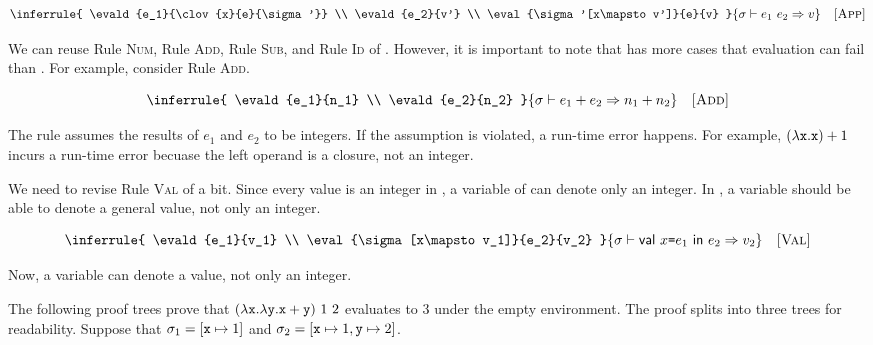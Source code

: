 \[
  \inferrule
  {
    \evald{e_1}{\clov{x}{e}{\sigma'}} \\
    \evald{e_2}{v'} \\
    \eval{\sigma'[x\mapsto v']}{e}{v}
  }
  { \evald{\eapp{e_1}{e_2}}{v} }
  \quad\textsc{[App]}
\]

We can reuse Rule \textsc{Num}, Rule \textsc{Add}, Rule \textsc{Sub}, and Rule \textsc{Id} of
\plang. However, it is important to note that \lang has more
cases that evaluation can fail than \plang. For example, consider Rule \textsc{Add}.


\vspace{-1em}

\[
  \inferrule
  {
    \evald{e_1}{n_1} \\
    \evald{e_2}{n_2}
  }
  { \evald{\eadd{e_1}{e_2}}{n_1+n_2} }
  \quad\textsc{[Add]}
\]

The rule assumes the results of $e_1$ and $e_2$ to be integers. If the
assumption is violated, a run-time error happens. For example,
$(\lambda\texttt{x}.\texttt{x})+1$ incurs a run-time error becuase the left operand
is a closure, not an integer.

We need to revise Rule \textsc{Val} of \plang a bit.
Since every value is an integer in \plang, a variable of \plang can denote only
an integer. In \lang, a variable should be able to denote a general value, not
only an integer.


\vspace{-1em}

\[
  \inferrule
  {
    \evald{e_1}{v_1} \\
    \eval{\sigma[x\mapsto v_1]}{e_2}{v_2}
  }
  { \evald{\ebind{x}{e_1}{e_2}}{v_2} }
  \quad\textsc{[Val]}
\]

Now, a variable can denote a value, not only an integer.

The following proof trees prove that
$(\lambda\texttt{x}.\lambda\texttt{y}.\texttt{x}+\texttt{y})\ 1\ 2$
evaluates to $3$ under the empty environment.
The proof splits into three trees for readability.
Suppose that $\sigma_1=[\texttt{x}\mapsto1]$ and $\sigma_2=[\texttt{x}\mapsto1,\texttt{y}\mapsto2]$.

